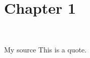 \blinddocument %
\chapter{Chapter 1}
\blindtext[2]\\

\begin{uquote}{My source}
	This is a quote.
\end{uquote}

\blindtext